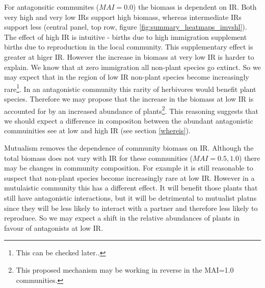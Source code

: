 \begin{itemize}
For antagonsitic communites ($MAI=0.0$) the biomass is dependent on IR. Both very high and very low IRs support high biomass, whereas intermediate IRs support less (central panel, top row, figure \ref{fig:summary_heatmaps_imvshl}). The effect of high IR is intuitive - births due to high immigration supplement births due to reproduction in the local community. This supplementary effect is greater at higer IR. However the increase in biomass at very low IR is harder to explain. We know that at zero immigration all non-plant species go extinct. So we may expect that in the region of low IR non-plant species become increasingly rare\footnote{This can be checked later..}. In an antagonistic community this rarity of herbivores would benefit plant species. Therefore we may propose that the increase in the biomass at low IR is accounted for by an increased abundance of plants\footnote{This proposed mechanism may be working in reverse in the MAI=1.0 communities.}. This reasoning suggests that we should expect a difference in compositon between the abundant antagonistic commuinities see at low and high IR (see section \ref{whereis}).    

Mutualism removes the dependence of community biomass on IR. Although the total biomass does not vary with IR for these communities ($MAI=0.5,1.0$) there may be changes in community composition. For example it is still reasonable to suspect that non-plant species become increasingly rare at low IR. However in a mutulaistic community this has a different effect. It will benefit those plants that still have antagonistic interactions, but it will be detrimental to mutualist platns since they will be less likely to interact with a partner and therefore less likely to reproduce. So we may expect a shift in the relative abundances of plants in favour of antagonists at low IR.



\end{itemize}
